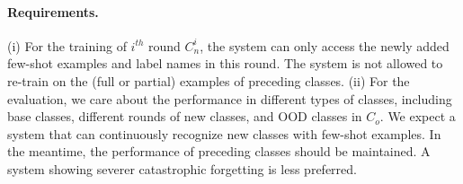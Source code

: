 \documentclass[11pt]{article}
\begin{document}





\paragraph{Requirements.}
(i) For the training of $i^{th}$ round $C_{n}^i$, the system can only access the newly added few-shot examples and label names in this round. The system is not allowed to re-train on the (full or partial) examples of preceding classes.
(ii) For the evaluation, we care about the performance in different types of classes, including base classes, different rounds of new classes, and OOD classes in $C_o$. We expect a system that can continuously recognize new classes with few-shot examples. In the meantime, the performance of preceding classes should be maintained.
A system showing severer catastrophic forgetting is less preferred.
\end{document}
